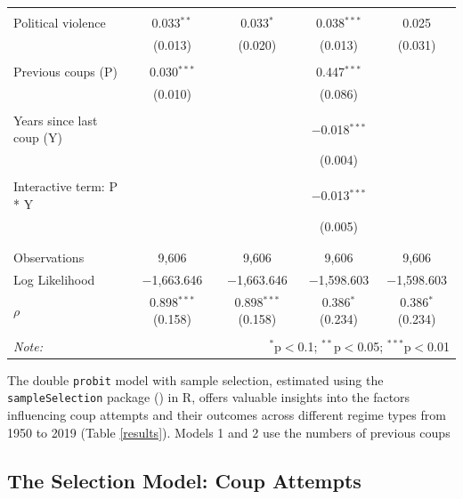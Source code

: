 \documentclass[
  12pt,
]{report}
\begin{document}
\begin{table}[!htbp]
\begin{tabular}{@{\extracolsep{7pt}}lcccc}
  & & & & \\ 
 Political violence & 0.033$^{**}$ & 0.033$^{*}$ & 0.038$^{***}$ & 0.025 \\ 
  & (0.013) & (0.020) & (0.013) & (0.031) \\ 
  & & & & \\ 
 Previous coups (P) & 0.030$^{***}$ &  & 0.447$^{***}$ &  \\ 
  & (0.010) &  & (0.086) &  \\ 
  & & & & \\ 
 Years since last coup (Y) &  &  & $-$0.018$^{***}$ &  \\ 
  &  &  & (0.004) &  \\ 
  & & & & \\ 
 Interactive term: P * Y &  &  & $-$0.013$^{***}$ &  \\ 
  &  &  & (0.005) &  \\ 
  & & & & \\ 
\hline \\[-1.8ex] 
Observations & 9,606 & 9,606 & 9,606 & 9,606 \\ 
Log Likelihood & $-$1,663.646 & $-$1,663.646 & $-$1,598.603 & $-$1,598.603 \\ 
$\rho$ & 0.898$^{***}$  (0.158) & 0.898$^{***}$  (0.158) & 0.386$^{*}$  (0.234) & 0.386$^{*}$  (0.234) \\ 
\hline 
\hline \\[-1.8ex] 
\textit{Note:}  & \multicolumn{4}{r}{$^{*}$p$<$0.1; $^{**}$p$<$0.05; $^{***}$p$<$0.01} \\ 
\end{tabular} 
\end{table}

The double \texttt{probit} model with sample selection, estimated using
the \texttt{sampleSelection} package
() in R,
offers valuable insights into the factors influencing coup attempts and
their outcomes across different regime types from 1950 to 2019 (Table
\ref{results}). Models 1 and 2 use the numbers of previous coups

\newpage

\subsection{The Selection Model: Coup
Attempts}\label{the-selection-model-coup-attempts}

\begingroup
\setlength{}
\setlength{}\fontsize{12.0pt}{14.4pt}\selectfont
\end{document}
